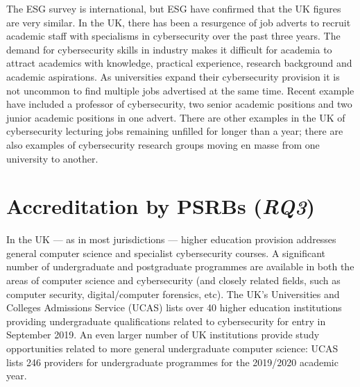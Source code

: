 \documentclass[conference]{IEEEtran}
\begin{document}
{The ESG survey is international, but ESG have confirmed that the UK figures are very similar. In the UK, there has been a resurgence of job adverts to recruit academic staff with specialisms in cybersecurity over the past three years. The demand for cybersecurity skills in industry makes it difficult for academia to attract academics with knowledge, practical experience, research background and academic aspirations. As universities expand their cybersecurity provision it is not uncommon to find multiple jobs advertised at the same time. Recent example have included a professor of cybersecurity, two senior academic positions and two junior academic positions in one advert. There are other examples in the UK of cybersecurity lecturing jobs remaining unfilled for longer than a year; there are also examples of cybersecurity research groups moving en masse from one university to another.


\section{Accreditation by PSRBs ({\emph{RQ3}})}

In the UK --- as in most jurisdictions --- higher education provision addresses general computer science and specialist cybersecurity courses. A significant number of undergraduate and postgraduate programmes are available in both the areas of computer science and cybersecurity (and closely related fields, such as computer security, digital/computer forensics, etc). The UK's Universities and Colleges Admissions Service (UCAS) lists over 40 higher education institutions providing undergraduate qualifications related to cybersecurity for entry in September 2019. An even larger number of UK institutions provide study opportunities related to more general undergraduate computer science: UCAS lists 246 providers for undergraduate programmes for the 2019/2020 academic year. 

}
\end{document}
